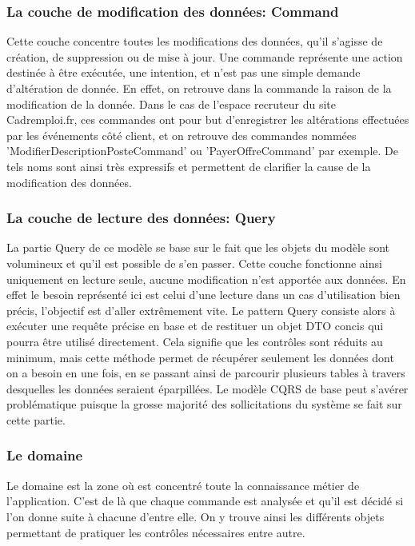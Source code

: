 \subsubsection{La couche de modification des données: Command}
\label{subs:La couche de modification des données: Command}
Cette couche concentre toutes les modifications des données, qu'il s'agisse de création, de suppression ou de mise à jour.
Une commande représente une action destinée à être exécutée, une intention, et n'est pas une simple demande d'altération de donnée.
En effet, on retrouve dans la commande la raison de la modification de la donnée.
Dans le cas de l'espace recruteur du site Cadremploi.fr, ces commandes ont pour but d'enregistrer les altérations effectuées par les événements côté client, et on retrouve des commandes nommées 'ModifierDescriptionPosteCommand' ou 'PayerOffreCommand' par exemple.
De tels noms sont ainsi très expressifs et permettent de clarifier la cause de la modification des données.
\subsubsection{La couche de lecture des données: Query}
\label{subs:La couche de lecture des données: Query}
La partie Query de ce modèle se base sur le fait que les objets du modèle sont volumineux et qu'il est possible de s'en passer.
Cette couche fonctionne ainsi uniquement en lecture seule, aucune modification n'est apportée aux données.
En effet le besoin représenté ici est celui d'une lecture dans un cas d'utilisation bien précis, l'objectif est d'aller extrêmement vite.
Le pattern Query consiste alors à exécuter une requête précise en base et de restituer un objet DTO concis qui pourra être utilisé directement.
Cela signifie que les contrôles sont réduits au minimum, mais cette méthode permet de récupérer seulement les données dont on a besoin en une fois, en se passant ainsi de parcourir plusieurs tables à travers desquelles les données seraient éparpillées.
Le modèle CQRS de base peut s'avérer problématique puisque la grosse majorité des sollicitations du système se fait sur cette partie.
\subsubsection{Le domaine}
\label{subs:Le domaine}
Le domaine est la zone où est concentré toute la connaissance métier de l'application.
C'est de là que chaque commande est analysée et qu'il est décidé si l'on donne suite à chacune d'entre elle.
On y trouve ainsi les différents objets permettant de pratiquer les contrôles nécessaires entre autre.

